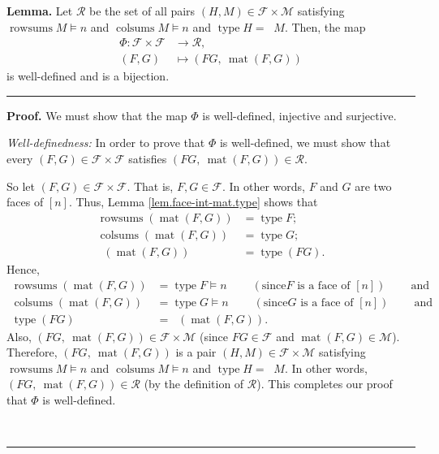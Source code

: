 \documentclass[12pt]{article}
\theoremstyle{definition}%
\newtheorem{lem}[thm]{Lemma}
\theoremstyle{definition}%
\theoremstyle{remark}%
\newcommand{\interval}[1]{\left[ #1 \right]} %
\newcommand{\CF}{\mathcal{F}}
\newcommand{\CM}{\mathcal{M}}
\newcommand{\CR}{\mathcal{R}}
\newcommand{\rowsums}{\operatorname{rowsums}}
\newcommand{\colsums}{\operatorname{colsums}}
\newcommand{\readb}{\mathop{\overline{\operatorname{read}}}}
\newcommand{\mat}{\operatorname{mat}}
\newcommand{\type}{\operatorname{type}}
\newenvironment{lem}[1][Lemma]{\noindent\textbf{#1.} }{\ \rule{0.5em}{0.5em}}
\newenvironment{proof}[1][Proof]{\noindent\textbf{#1.} }{\ \rule{0.5em}{0.5em}}
\begin{document}
\begin{lem}
\label{lem.face-int-bij}Let $\CR$ be the set of all pairs $\left(
H,M\right)  \in\CF \times\CM$ satisfying
$\rowsums M\models n$ and $\colsums M\models n$
and $\type H=\readb M$. Then, the map
\begin{align}
\Phi:\CF \times\CF   &  \rightarrow\CR,\nonumber\\
\left(  F,G\right)   &  \mapsto\left(  FG,\ \mat\left(
F,G\right)  \right)
\label{eq.lem.face-int-bij.bij}
\end{align}
is well-defined and is a bijection.
\end{lem}

\begin{proof}
We must show that the map $\Phi$ is well-defined, injective and surjective.
\medskip

\textit{Well-definedness:} In order to prove that $\Phi$ is well-defined, we
must show that every $\left(  F,G\right)  \in\CF \times\CF $
satisfies $\left(  FG,\ \mat\left(  F,G\right)  \right)
\in\CR$.

So let $\left(  F,G\right)  \in\CF \times\CF $. That is,
$F,G\in\CF $. In other words, $F$ and $G$ are two faces of
$\interval{n}$. Thus, Lemma \ref{lem.face-int-mat.type} shows that
\begin{align*}
\rowsums \left(  \mat\left(  F,G\right)  \right)
&  =\type F;\\
\colsums \left(  \mat\left(  F,G\right)  \right)
&  =\type G;\\
\readb \left(  \mat\left(  F,G\right)
\right)   &  =\type \left(  FG\right)  .
\end{align*}
Hence,
\begin{align*}
\rowsums \left(  \mat\left(  F,G\right)  \right)
&  =\type F\models n\ \ \ \ \ \ \ \ \ \ \left(  \text{since
}F\text{ is a face of }\interval{n}\right)
\ \ \ \ \ \ \ \ \ \ \text{and}\\
\colsums \left(  \mat\left(  F,G\right)  \right)
&  =\type G\models n\ \ \ \ \ \ \ \ \ \ \left(  \text{since
}G\text{ is a face of }\interval{n}\right)
\ \ \ \ \ \ \ \ \ \ \text{and}\\
\type \left(  FG\right)   &  =\readb
\left(  \mat\left(  F,G\right)  \right)  .
\end{align*}
Also, $\left(  FG,\ \mat\left(  F,G\right)  \right)
\in\CF \times\CM$ (since $FG\in\CF $ and
$\mat\left(  F,G\right)  \in\CM$). Therefore, $\left(
FG,\ \mat\left(  F,G\right)  \right)  $ is a pair $\left(
H,M\right)  \in\CF \times\CM$ satisfying
$\rowsums M\models n$ and $\colsums M\models n$
and $\type H=\readb M$. In other words,
$\left(  FG,\ \mat\left(  F,G\right)  \right)  \in\CR$
(by the definition of $\CR$). This completes our proof that $\Phi$ is
well-defined. \medskip


\end{proof}
\end{document}
